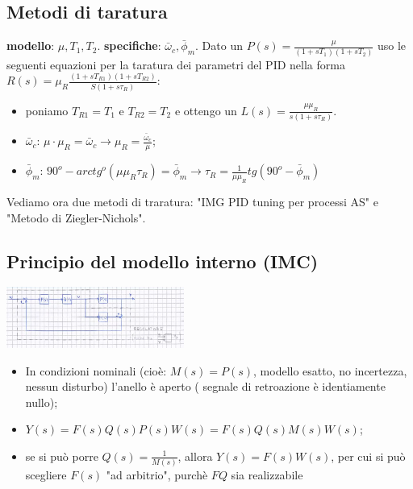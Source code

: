     \subsection{Metodi di taratura}
    \textbf{modello}: $\mu, T_1, T_2$.\newline
    \textbf{specifiche}: $\bar{\omega}_c, \bar{\phi}_m$.\newline
    \newline
    Dato un $P(s) = \frac{\mu}{(1+sT_1) (1+sT_2)}$ uso le seguenti equazioni per la taratura dei parametri del PID nella forma $R(s) = \mu_R \frac{(1+sT_{R1}) (1+sT_{R2})}{S (1+s \tau_R)}$:
    \begin{itemize}
        \item poniamo $T_{R1} = T_1$ e $T_{R2} = T_2$ e ottengo un $L(s) = \frac{\mu \mu_R}{s(1+s \tau_R)}$.
        \item $\bar{\omega}_c$: $\mu \cdot \mu_R = \bar{\omega}_c \rightarrow \mu_R = \frac{\bar{\omega}_c}{\mu}$;
        \item $\bar{\phi}_m$: $90^o - arctg^o(\mu \mu_R \tau_R) = \bar{\phi}_m \rightarrow \tau_R = \frac{1}{\mu \mu_R} tg(90^o - \bar{\phi}_m)$  
    \end{itemize}
    Vediamo ora due metodi di traratura: "IMG PID tuning per processi AS" e "Metodo di Ziegler-Nichols".
    \subsection{Principio del modello interno (IMC)}
    \begin{center}
        \includegraphics[height=2cm]{../formulario/img6.JPG}
    \end{center}
    \begin{itemize}
        \item In condizioni nominali (cioè: $M(s) = P(s)$, modello esatto, no incertezza, nessun disturbo) l'anello è aperto ( segnale di retroazione è identiamente nullo);
        \item $Y(s) = F(s)Q(s)P(s)W(s) = F(s) Q(s)M(s)W(s)$;
        \item se si può porre $Q(s) = \frac{1}{M(s)}$, allora $Y(s) = F(s) W(s)$, per cui si può scegliere $F(s)$ "ad arbitrio", purchè $FQ$ sia realizzabile
    \end{itemize}
